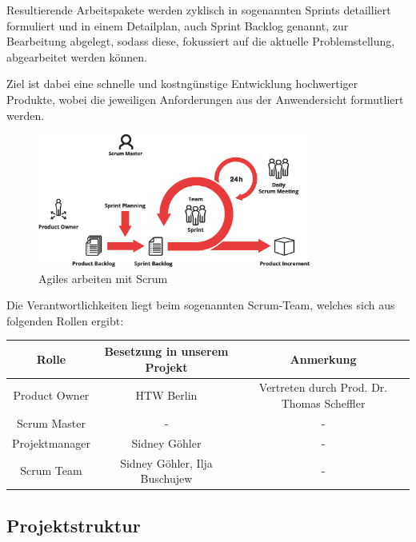 Resultierende Arbeitspakete werden zyklisch in sogenannten Sprints detailliert formuliert und in einem Detailplan, auch Sprint Backlog genannt, zur Bearbeitung abgelegt, sodass diese, fokussiert auf die aktuelle Problemstellung, abgearbeitet werden können.

Ziel ist dabei eine schnelle und kostngünstige Entwicklung hochwertiger Produkte, wobei die jeweiligen Anforderungen aus der Anwendersicht formutliert werden.

\begin{figure}[h]
	 \centering
	 \includegraphics[width=0.8\textwidth]{pictures/scrum}
	 \caption[Agiles arbeiten mit Scrum]{Agiles arbeiten mit Scrum\cite{scrum2018}}
	 \label{fig:scrum}
\end{figure}

Die Verantwortlichkeiten liegt beim sogenannten Scrum-Team, welches sich aus folgenden Rollen ergibt:
\begin{adjustwidth}{-1in}{-1in}%
	\begin{center}
		\begin{tabular}{ ccc }
			\toprule
			{Rolle} & {Besetzung in unserem Projekt} & {Anmerkung}\\

			\midrule
			{Product Owner} & {HTW Berlin} & {Vertreten durch Prod. Dr. Thomas Scheffler}\\
			{Scrum Master} & {-} & {-}\\
			{Projektmanager} & {Sidney Göhler} & {-}\\
			{Scrum Team} & {Sidney Göhler, Ilja Buschujew} & {-}\\
			\bottomrule
		\end{tabular}
		 \label{tab:scrumverantwortung} 
    \end{center}
\end{adjustwidth}


\newpage

\subsection{Projektstruktur} \label{Projektstruktur}

